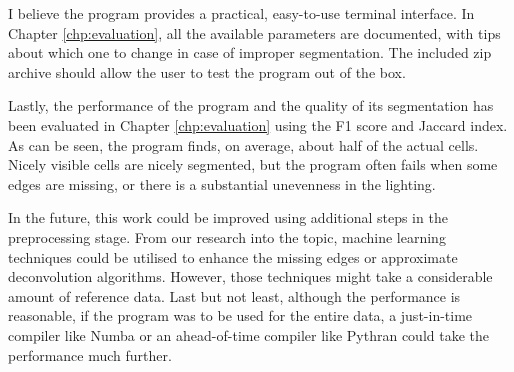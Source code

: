 \documentclass[
  digital,     %
  oneside,     %
  nosansbold,  %
  nocolorbold, %
  lof,         %
  lot,         %
]{fithesis4}
\begin{document}
I believe the program provides a practical, easy-to-use terminal interface. In Chapter \ref{chp:evaluation}, all the available parameters are documented, with tips about which one to change in case of improper segmentation.  The included zip archive should allow the user to test the program out of the box.

Lastly, the performance of the program and the quality of its segmentation has been evaluated in Chapter \ref{chp:evaluation} using the F1 score and Jaccard index. As can be seen, the program finds, on average, about half of the actual cells. Nicely visible cells are nicely segmented, but the program often fails when some edges are missing, or there is a substantial unevenness in the lighting. 

In the future, this work could be improved using additional steps in the preprocessing stage. From our research into the topic, machine learning techniques could be utilised to enhance the missing edges or approximate deconvolution algorithms. However, those techniques might take a considerable amount of reference data. Last but not least, although the performance is reasonable, if the program was to be used for the entire data, a just-in-time compiler like Numba or an ahead-of-time compiler like Pythran could take the performance much further.
\end{document}
